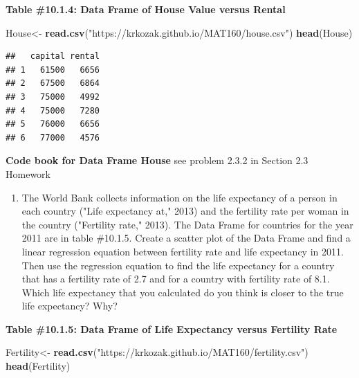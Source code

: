 \documentclass[
]{book}
\newenvironment{Shaded}{\begin{snugshade}}{\end{snugshade}}
\newcommand{\KeywordTok}[1]{\textcolor[rgb]{0.13,0.29,0.53}{\textbf{#1}}}
\newcommand{\NormalTok}[1]{#1}
\newcommand{\StringTok}[1]{\textcolor[rgb]{0.31,0.60,0.02}{#1}}
\providecommand{\tightlist}{%
  \setlength{\itemsep}{0pt}\setlength{\parskip}{0pt}}
\begin{document}
\textbf{Table \#10.1.4: Data Frame of House Value versus Rental}

\begin{Shaded}
\begin{Highlighting}[]
\NormalTok{House<-}\StringTok{ }\KeywordTok{read.csv}\NormalTok{(}\StringTok{"https://krkozak.github.io/MAT160/house.csv"}\NormalTok{)}
\KeywordTok{head}\NormalTok{(House)}
\end{Highlighting}
\end{Shaded}

\begin{verbatim}
##   capital rental
## 1   61500   6656
## 2   67500   6864
## 3   75000   4992
## 4   75000   7280
## 5   76000   6656
## 6   77000   4576
\end{verbatim}

\textbf{Code book for Data Frame House} see problem 2.3.2 in Section 2.3 Homework

\begin{enumerate}
\def\labelenumi{\arabic{enumi}.}
\setcounter{enumi}{2}
\tightlist
\item
  The World Bank collects information on the life expectancy of a person in each country ("Life expectancy at," 2013) and the fertility rate per woman in the country ("Fertility rate," 2013). The Data Frame for countries for the year 2011 are in table \#10.1.5. Create a scatter plot of the Data Frame and find a linear regression equation between fertility rate and life expectancy in 2011. Then use the regression equation to find the life expectancy for a country that has a fertility rate of 2.7 and for a country with fertility rate of 8.1. Which life expectancy that you calculated do you think is closer to the true life expectancy? Why?
\end{enumerate}

\textbf{Table \#10.1.5: Data Frame of Life Expectancy versus Fertility Rate}

\begin{Shaded}
\begin{Highlighting}[]
\NormalTok{Fertility<-}\StringTok{ }\KeywordTok{read.csv}\NormalTok{(}\StringTok{"https://krkozak.github.io/MAT160/fertility.csv"}\NormalTok{)}
\KeywordTok{head}\NormalTok{(Fertility)}
\end{Highlighting}
\end{Shaded}
\end{document}
